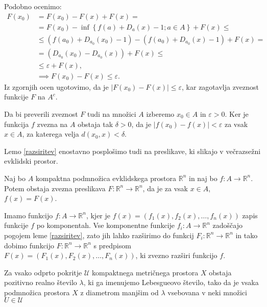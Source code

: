 \documentclass[mat1]{fmfdelo}
\newcommand{\R}{\mathbb R}
\newcommand{\0}{\underline{0}}
\begin{document}
\begin{dokaz}
Podobno ocenimo:
\begin{equation*} \label{eq1}
\begin{split}
F(x_0) & = F(x_0) - F(x) + F(x) = \\
& = F(x_0) - \inf \left \{ f(a) + D_a(x) - 1; a \in A \right \} + F(x) \leq \\
& \leq (f(a_0) + D_{a_0}(x_0) - 1) -  (f(a_0) + D_{a_0}(x) - 1) + F(x) = \\
& = (D_{a_0}(x_0) -  D_{a_0}(x)) + F(x) \leq \\
& \leq \varepsilon + F(x), \\
& \implies F(x_0) - F(x) \leq \varepsilon.
\end{split}
\end{equation*}
Iz zgornjih ocen ugotovimo, da je $|F(x_0) - F(x)| \leq \varepsilon$, kar zagotavlja zveznost funkcije $F$ na $A^c$.

Da bi preverili zveznost $F$ tudi na množici $A$ izberemo $x_0 \in A$ in $\varepsilon > 0$. Ker je funkcija $f$ zvezna na $A$ obstaja tak $\delta > 0$, da je $|f(x_0) - f(x)| < \varepsilon$ za vsak $x \in A$, za katerega velja $d(x_0, x) < \delta$. 
\end{dokaz}

Lemo \ref{razsiritev} enostavno posplošimo tudi na preslikave, ki slikajo v večrazsežni evklidski prostor.

\begin{posledica}
Naj bo $A$ kompaktna podmnožica evklidskega prostora $\R^n$ in naj bo \mbox{$f : A \to \R^n$}. Potem obstaja zvezna preslikava $F : \R^n \to \R^n$, da je za vsak $x \in A$, $f(x) = F(x)$.
\end{posledica}

\begin{dokaz}
Imamo funkcijo $f : A \to \R^n$, kjer je $f(x) = (f_1(x), f_2(x), \dots , f_n(x))$ zapis funkcije $f$ po komponentah. Vse komponentne funkcije $f_i : A \to \R^n$ zadoščajo pogojem leme \ref{razsiritev}, zato jih lahko razširimo do funkcij $F_i : \R^n \to \R^n$ in tako dobimo funkcijo $F : \R^n \to \R^n$ s predpisom $F(x) = (F_1(x), F_2(x), \dots , F_n(x))$, ki zvezno razširi funkcijo $f$.
\end{dokaz}

\begin{lema}\label{lem:lebesgue}
Za vsako odprto pokritje $\mathcal{U}$ kompaktnega metričnega prostora $X$ obstaja pozitivno realno število $\lambda$, ki ga imenujemo Lebesgueovo število, tako da je vsaka podmnožica prostora $X$ z diametrom manjšim od $\lambda$ vsebovana v neki množici $U \in \mathcal{U}$
\end{lema}
\end{document}
